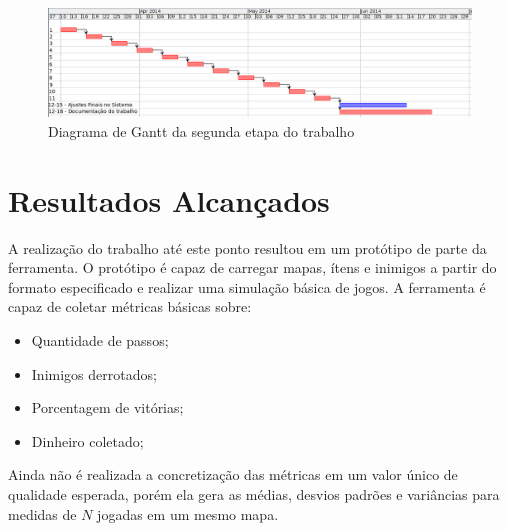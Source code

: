 \begin{figure}[h]
	\centering
	\label{fig17}
		\includegraphics[keepaspectratio=true,scale=0.38]{figuras/fig17-cronograma2v.png}
	\caption{Diagrama de Gantt da segunda etapa do trabalho}
\end{figure} 

\chapter{Resultados Alcançados}

	A realização do trabalho até este ponto resultou em um protótipo de parte da ferramenta. O protótipo é capaz de carregar mapas, ítens e inimigos a partir do formato especificado e realizar uma simulação básica de jogos. 
	A ferramenta é capaz de coletar métricas básicas sobre:
\begin{itemize}			
	\item Quantidade de passos;
	\item Inimigos derrotados;
	\item Porcentagem de vitórias;
	\item Dinheiro coletado;
\end{itemize}

	Ainda não é realizada a concretização das métricas em um valor único de qualidade esperada, porém ela gera as médias, desvios padrões e variâncias para medidas de $N$ jogadas em um mesmo mapa. 
	
